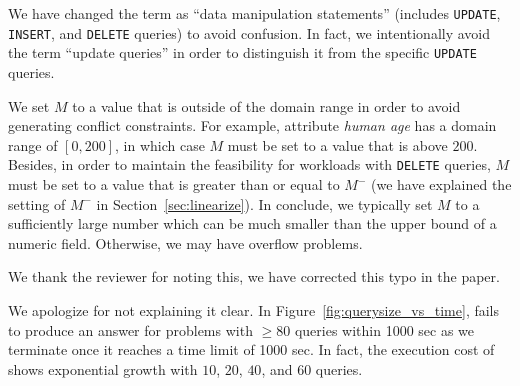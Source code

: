 \begin{quote}
\end{quote}

We have changed the term as ``data manipulation statements'' (includes \texttt{UPDATE},
\texttt{INSERT}, and \texttt{DELETE} queries) to avoid confusion. In fact, 
we intentionally avoid the term ``update queries'' in order to distinguish it from the 
specific \texttt{UPDATE} queries. 


\begin{quote}
\end{quote}

We set $M$ to a value that is outside of the domain range in order to 
avoid generating conflict constraints. 
For example, attribute \textit{human age} has a domain range of $[0, 200]$, 
in which case $M$ must be set to a value that is above $200$. 
Besides, in order to maintain the feasibility for workloads with \texttt{DELETE}
queries, $M$ must be set to a value that is greater than or equal to $M^-$ (we have explained
the setting of $M^-$ in Section~\ref{sec:linearize}). 
In conclude, we typically set $M$ to a sufficiently large number which can be 
much smaller than the upper bound of a numeric field. Otherwise, we may
have overflow problems.

\begin{quote}
\end{quote}

We thank the reviewer for noting this, we have corrected this typo in the paper. 

\begin{quote}
\end{quote}
We apologize for not explaining it clear. In Figure~\ref{fig:querysize_vs_time}, \naive fails to produce an answer
for problems with $\geq 80$ queries within 1000 sec as we terminate \naive once it reaches a time limit of 1000 sec. 
In fact, the execution cost of \naive shows exponential growth with $10$, $20$, $40$, and $60$ queries. 


